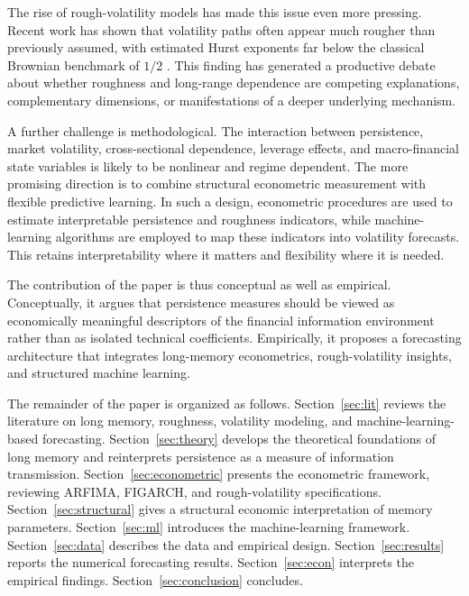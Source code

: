 \documentclass[12pt]{article}
\begin{document}
The rise of rough-volatility models has made this issue even more pressing. Recent work has shown that volatility paths often appear much rougher than previously assumed, with estimated Hurst exponents far below the classical Brownian benchmark of $1/2$ \citep{Gatheral2018, Bennedsen2021}. This finding has generated a productive debate about whether roughness and long-range dependence are competing explanations, complementary dimensions, or manifestations of a deeper underlying mechanism.

A further challenge is methodological. The interaction between persistence, market volatility, cross-sectional dependence, leverage effects, and macro-financial state variables is likely to be nonlinear and regime dependent. The more promising direction is to combine structural econometric measurement with flexible predictive learning. In such a design, econometric procedures are used to estimate interpretable persistence and roughness indicators, while machine-learning algorithms are employed to map these indicators into volatility forecasts. This retains interpretability where it matters and flexibility where it is needed.

The contribution of the paper is thus conceptual as well as empirical. Conceptually, it argues that persistence measures should be viewed as economically meaningful descriptors of the financial information environment rather than as isolated technical coefficients. Empirically, it proposes a forecasting architecture that integrates long-memory econometrics, rough-volatility insights, and structured machine learning.

The remainder of the paper is organized as follows. Section~\ref{sec:lit} reviews the literature on long memory, roughness, volatility modeling, and machine-learning-based forecasting. Section~\ref{sec:theory} develops the theoretical foundations of long memory and reinterprets persistence as a measure of information transmission. Section~\ref{sec:econometric} presents the econometric framework, reviewing ARFIMA, FIGARCH, and rough-volatility specifications. Section~\ref{sec:structural} gives a structural economic interpretation of memory parameters. Section~\ref{sec:ml} introduces the machine-learning framework. Section~\ref{sec:data} describes the data and empirical design. Section~\ref{sec:results} reports the numerical forecasting results. Section~\ref{sec:econ} interprets the empirical findings. Section~\ref{sec:conclusion} concludes.

\end{document}
